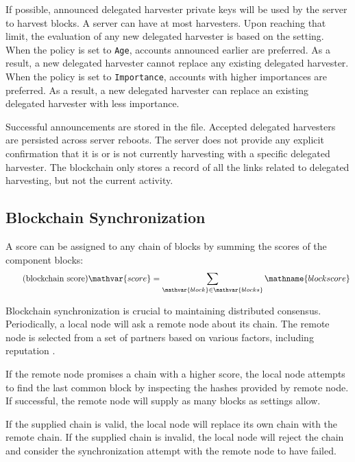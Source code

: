 If possible, announced delegated harvester private keys will be used by the server to harvest blocks.
A server can have at most  harvesters.
Upon reaching that limit, the evaluation of any new delegated harvester is based on the  setting.
When the policy is set to \texttt{Age}, accounts announced earlier are preferred.
As a result, a new delegated harvester cannot replace any existing delegated harvester.
When the policy is set to \texttt{Importance}, accounts with higher importances are preferred.
As a result, a new delegated harvester can replace an existing delegated harvester with less importance.

Successful announcements are stored in the  file.
Accepted delegated harvesters are persisted across server reboots.
The server does not provide any explicit confirmation that it is or is not currently harvesting with a specific delegated harvester.
The blockchain only stores a record of all the links related to delegated harvesting, but not the current activity.

\subsection{Blockchain Synchronization}
\label{sec:blockchain:sync}

A score can be assigned to any chain of blocks by summing the scores of the component blocks:
\begin{equation}
	\tag{blockchain score} \mathvar{score} = \sum_{\mathvar{block} \in \mathvar{blocks}} \mathname{block score}
\end{equation}

Blockchain synchronization is crucial to maintaining distributed consensus.
Periodically, a local node will ask a remote node about its chain.
The remote node is selected from a set of partners based on various factors, including reputation .

If the remote node promises a chain with a higher score, the local node attempts to find the last common block by inspecting the hashes provided by remote node.
If successful, the remote node will supply as many blocks as settings allow.

If the supplied chain is valid, the local node will replace its own chain with the remote chain.
If the supplied chain is invalid, the local node will reject the chain and consider the synchronization attempt with the remote node to have failed.


